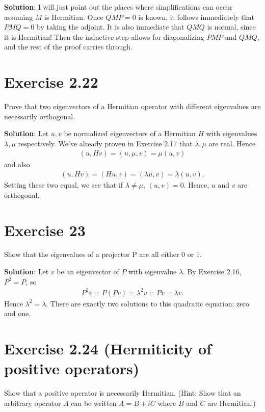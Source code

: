 \documentclass{book}
\begin{document}
    \textbf{Solution}: I will just point out the places where simplifications can occur assuming $M$ is Hermitian. Once $QMP = 0$ is known, it follows immediately that $PMQ = 0$ by taking the adjoint. It is also immediate that $QMQ$ is normal, since it is Hermitian! Then the inductive step allows for diagonalizing $PMP$ and $QMQ$, and the rest of the proof carries through. 
    
\section*{Exercise 2.22}
    Prove that two eigenvectors of a Hermitian operator with different eigenvalues are necessarily orthogonal.
    
    \textbf{Solution}: Let $u, v$ be normalized eigenvectors of a Hermitian $H$ with eigenvalues $\lambda, \mu$ respectively. We've already proven in Exercise 2.17 that $\lambda, \mu$ are real. Hence
    \begin{align}
        (u, Hv) = (u, \mu, v) = \mu (u,v)
    \end{align}
    and also
    \begin{align}
        (u, Hv) = (H u, v) = (\lambda u, v) = \lambda (u,v).
    \end{align}
    Setting these two equal, we see that if $\lambda \neq \mu$, $(u,v) = 0$. Hence, $u$ and $v$ are orthogonal.
    
\section*{Exercise 23}
    Show that the eigenvalues of a projector P are all either 0 or 1.
    
    \textbf{Solution}: Let $v$ be an eigenvector of $P$ with eigenvalue $\lambda$. By Exercise 2.16, $P^2 = P$, so
    \begin{align}
        P^2 v = P (Pv) = \lambda^2 v = P v = \lambda v.
    \end{align}
    Hence $\lambda^2 = \lambda$. There are exactly two solutions to this quadratic equation: zero and one.
    
\section*{Exercise 2.24 (Hermiticity of positive operators)}
    Show that a positive operator is necessarily Hermitian. (Hint: Show that an arbitrary operator $A$ can be written $A = B + iC$ where $B$ and $C$ are Hermitian.)
    
\end{document}
